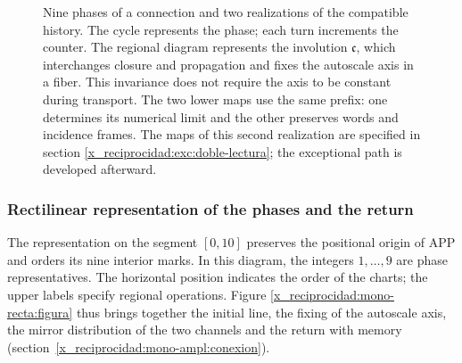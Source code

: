 \begin{figure}[p]
\caption{Nine phases of a connection and two realizations of the compatible
history. The cycle represents the phase; each turn increments the counter.
The regional diagram represents the involution \(\mathfrak c\), which
interchanges closure and propagation and fixes the autoscale axis in a fiber.
This invariance does not require the axis to be constant during transport.
The two lower maps use the same prefix: one determines
its numerical limit and the other preserves words and incidence frames. The
maps of this second realization are specified in section
\ref{x_reciprocidad:exc:doble-lectura}; the exceptional path is developed afterward.}
\label{x_reciprocidad:mono-ampl:fig-regional}
\end{figure}




\clearpage
\subsubsection{Rectilinear representation of the phases and the return}
\label{x_reciprocidad:mono-recta:desarrollo}

The representation on the segment \([0,10]\) preserves the positional
origin of APP and orders its nine interior marks. In this diagram,
the integers \(1,\ldots,9\) are phase representatives. The horizontal
position indicates the order of the charts; the upper labels
specify regional operations. Figure
\ref{x_reciprocidad:mono-recta:figura} thus brings together the initial line, the fixing of the
autoscale axis, the mirror distribution of the two channels and the
return with memory (section~\ref{x_reciprocidad:mono-ampl:conexion}).


